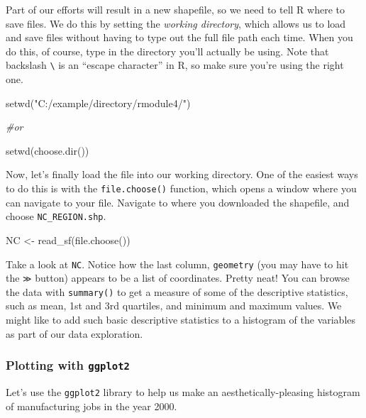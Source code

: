 \documentclass[
]{article}
\newenvironment{Shaded}{\begin{snugshade}}{\end{snugshade}}
\newcommand{\CommentTok}[1]{\textcolor[rgb]{0.56,0.35,0.01}{\textit{#1}}}
\newcommand{\FunctionTok}[1]{\textcolor[rgb]{0.00,0.00,0.00}{#1}}
\newcommand{\NormalTok}[1]{#1}
\newcommand{\OtherTok}[1]{\textcolor[rgb]{0.56,0.35,0.01}{#1}}
\newcommand{\StringTok}[1]{\textcolor[rgb]{0.31,0.60,0.02}{#1}}
\begin{document}
Part of our efforts will result in a new shapefile, so we need to tell R
where to save files. We do this by setting the \emph{working directory},
which allows us to load and save files without having to type out the
full file path each time. When you do this, of course, type in the
directory you'll actually be using. Note that backslash
\texttt{\textbackslash{}} is an ``escape character'' in R, so make sure
you're using the right one.

\begin{Shaded}
\begin{Highlighting}[]
\FunctionTok{setwd}\NormalTok{(}\StringTok{"C:/example/directory/rmodule4/"}\NormalTok{)}

\CommentTok{\#or}

\FunctionTok{setwd}\NormalTok{(}\FunctionTok{choose.dir}\NormalTok{())}
\end{Highlighting}
\end{Shaded}

Now, let's finally load the file into our working directory. One of the
easiest ways to do this is with the \texttt{file.choose()} function,
which opens a window where you can navigate to your file. Navigate to
where you downloaded the shapefile, and choose \texttt{NC\_REGION.shp}.

\begin{Shaded}
\begin{Highlighting}[]
\NormalTok{NC }\OtherTok{\textless{}{-}} \FunctionTok{read\_sf}\NormalTok{(}\FunctionTok{file.choose}\NormalTok{())}
\end{Highlighting}
\end{Shaded}

Take a look at \texttt{NC}. Notice how the last column,
\texttt{geometry} (you may have to hit the \texttt{≫} button) appears to
be a list of coordinates. Pretty neat! You can browse the data with
\texttt{summary()} to get a measure of some of the descriptive
statistics, such as mean, 1st and 3rd quartiles, and minimum and maximum
values. We might like to add such basic descriptive statistics to a
histogram of the variables as part of our data exploration.

\hypertarget{plotting-with-ggplot2}{%
\subsubsection{\texorpdfstring{Plotting with
\texttt{ggplot2}}{Plotting with ggplot2}}\label{plotting-with-ggplot2}}

Let's use the \texttt{ggplot2} library to help us make an
aesthetically-pleasing histogram of manufacturing jobs in the year 2000.
\end{document}
